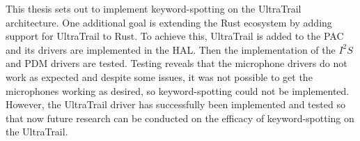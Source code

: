 
This thesis sets out to implement keyword-spotting on the UltraTrail architecture.
One additional goal is extending the Rust ecosystem by adding support for UltraTrail to Rust.
To achieve this, UltraTrail is added to the PAC and its drivers are implemented in the HAL.
Then the implementation of the $I^2S$ and PDM drivers are tested.
Testing reveals that the microphone drivers do not work as expected and despite
some issues, it was not possible to get the microphones working as desired,
so keyword-spotting could not be implemented.
However, the UltraTrail driver has successfully been implemented and tested so that
now future research can be conducted on the efficacy of keyword-spotting on the UltraTrail.
